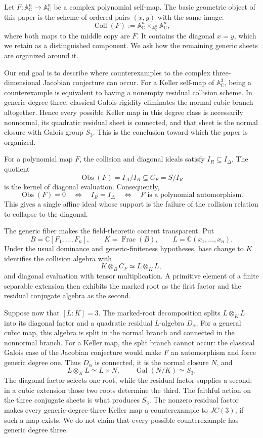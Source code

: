 \documentclass[11pt]{article}
\theoremstyle{remark}
\theoremstyle{definition}
\DeclareMathOperator{\Frac}{Frac}
\DeclareMathOperator{\Gal}{Gal}
\newcommand{\A}{\mathbb A}
\newcommand{\C}{\mathbb C}
\newcommand{\Obs}{\operatorname{Obs}}
\begin{document}
Let \(F\colon\A^n_{\C}\to\A^n_{\C}\) be a complex polynomial
self-map.  The basic geometric object of this paper is the scheme of
ordered pairs \((x,y)\) with the same image:
\[
  \operatorname{Coll}(F)
  :=\A^n_{\C}\times_{\A^n_{\C}}\A^n_{\C},
\]
where both maps to the middle copy are \(F\).  It contains the diagonal
\(x=y\), which we retain as a distinguished component.  We ask how the remaining
generic sheets are organized around it.

Our end goal is to describe where counterexamples to the complex
three-dimensional Jacobian conjecture can occur.  For a Keller self-map
of \(\A^3_{\C}\), being a counterexample is equivalent to having a
nonempty residual collision scheme.  In generic degree three, classical
Galois rigidity eliminates the normal cubic branch altogether.  Hence
every possible Keller map in this degree class is necessarily nonnormal,
its quadratic residual sheet is connected, and that sheet is the normal
closure with Galois group \(S_3\).  This is the conclusion toward which
the paper is organized.

For a polynomial map \(F\), the collision and diagonal ideals satisfy
\(I_R\subseteq I_\Delta\).  The quotient
\[
  \Obs(F)=I_\Delta/I_R\subseteq C_F=S/I_R
\]
is the kernel of diagonal evaluation.  Consequently,
\[
  \Obs(F)=0
  \quad\Longleftrightarrow\quad
  I_R=I_\Delta
  \quad\Longleftrightarrow\quad
  F\text{ is a polynomial automorphism}.
\]
This gives a single affine ideal whose support is the failure of the
collision relation to collapse to the diagonal.

The generic fiber makes the field-theoretic content transparent.  Put
\[
  B=\C[F_1,\dots,F_n],\qquad
  K=\Frac(B),\qquad
  L=\C(x_1,\dots,x_n).
\]
Under the usual dominance and generic-finiteness hypotheses, base change
to \(K\) identifies the collision algebra with
\[
  K\otimes_BC_F\simeq L\otimes_KL,
\]
and diagonal evaluation with tensor multiplication.  A primitive element
of a finite separable extension then exhibits the marked root as the first
factor and the residual conjugate algebra as the second.

Suppose now that \([L:K]=3\).  The marked-root decomposition splits
\(L\otimes_KL\) into its diagonal factor and a quadratic residual
\(L\)-algebra \(D_\alpha\).  For a general cubic map, this algebra is
split in the normal branch and connected in the nonnormal branch.  For a
Keller map, the split branch cannot occur: the classical Galois case of
the Jacobian conjecture would make \(F\) an automorphism and force generic
degree one.  Thus \(D_\alpha\) is connected, it is the normal closure
\(N\), and
\[
  L\otimes_KL\simeq L\times N,
  \qquad
  \Gal(N/K)\simeq S_3.
\]
The diagonal factor selects one root, while the residual factor supplies a
second; in a cubic extension those two roots determine the third.  The
faithful action on the three conjugate sheets is what produces \(S_3\).
The nonzero residual factor makes every generic-degree-three Keller map a
counterexample to \(JC(3)\), if such a map exists.  We do not claim that
every possible counterexample has generic degree three.
\end{document}
